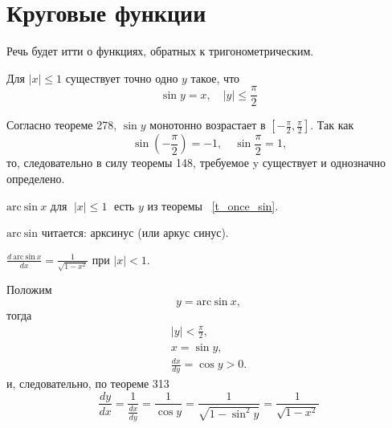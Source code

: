 \chapter{Круговые функции}
\par Речь будет итти о функциях, обратных к тригонометрическим.

\begin{theorem}\label{t_once_sin}
    Для $|x| \leqslant 1$ существует точно одно $y$ такое, что 
   $$\sin y = x,\quad |y| \leqslant \frac {\pi}{2}$$  
\end{theorem}

\begin{breakproof}
    Согласно теореме 278, $\sin y$ монотонно возрастает в 
    $\left\lbrack -\frac{\pi}{2}, \frac{\pi}{2} \right\rbrack$. Так как
    $$\sin\left(-\frac{\pi}{2}\right) = -1,\quad \sin \frac{\pi}{2} = 1\text{,}$$
    то, следовательно в силу теоремы 148, требуемое 
    y существует и однозначно определено.
\end{breakproof}
\begin{definition}
    $\mathrm{arc\ sin}\ x$ для $\;|x| \leqslant 1\;$ есть $y$ из теоремы ~\ref{t_once_sin}.\par
    \textnormal{$\mathrm{arc\ sin}$ читается: арксинус (или аркус синус).}
\end{definition}
\begin{theorem}
    $\frac{d\ \mathrm{arc\ sin}\ x}{dx} = \frac{1}{\sqrt{1 - x^2}} \text{ при  } |x| < 1$.
\end{theorem}

\begin{breakproof}
    Положим 
    $$ y = \mathrm{arc\ sin}\ x,$$
    тогда
    \begin{gather*}
        |y| < \frac {\pi}{2},\\
        x = \sin y,\\
        \frac {dx}{dy} = \cos y > 0.
    \end{gather*}
    и, следовательно, по теореме 313
    $$\frac{dy}{dx} = \frac{1}{\frac{dx}{dy}} = \frac{1}{\cos y} = \frac{1}{\sqrt{1 - \sin^2y}} = \frac{1}{\sqrt{1-x^2}}$$
\end{breakproof}
